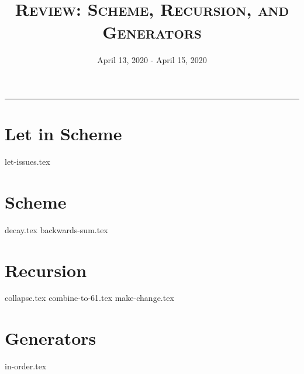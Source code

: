 \documentclass{exam}
\title{\textsc{Review: Scheme, Recursion, and Generators}}
\date{April 13, 2020 - April 15, 2020}
\begin{document}
\maketitle
\rule{\textwidth}{0.15em}
\fontsize{12}{15}\selectfont

\section{Let in Scheme}
\begin{questions}
{let-issues.tex}
\end{questions}
\newpage

\section{Scheme}
\begin{questions}
{decay.tex}
{backwards-sum.tex}
\end{questions}
\newpage

\section{Recursion}
\begin{questions}
{collapse.tex}
{combine-to-61.tex}
{make-change.tex}
\end{questions}

\section{Generators}
\begin{questions}
{in-order.tex}
\end{questions}
\end{document}
